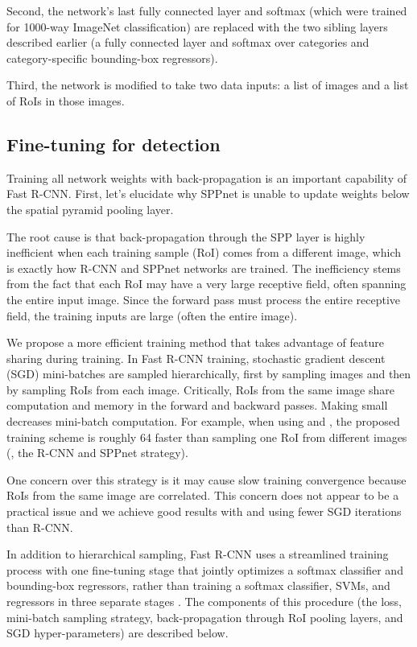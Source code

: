 \documentclass[10pt,twocolumn,letterpaper]{article}
\newcommand{\X}{\xspace}
\newcommand{\roi}{RoI\xspace}
\begin{document}
Second, the network's last fully connected layer and softmax (which were trained for 1000-way ImageNet classification) are replaced with the two sibling layers described earlier (a fully connected layer and softmax over  categories and category-specific bounding-box regressors).

Third, the network is modified to take two data inputs: a list of images and a list of {\roi}s in those images.


\subsection{Fine-tuning for detection}
Training all network weights with back-propagation is an important capability of Fast R-CNN.
First, let's elucidate why SPPnet is unable to update weights below the spatial pyramid pooling layer.

The root cause is that back-propagation through the SPP layer is highly inefficient when each training sample (\ie \roi) comes from a different image, which is exactly how R-CNN and SPPnet networks are trained.
The inefficiency stems from the fact that each \roi may have a very large receptive field, often spanning the entire input image.
Since the forward pass must process the entire receptive field, the training inputs are large (often the entire image).

We propose a more efficient training method that takes advantage of feature sharing during training.
In Fast R-CNN training, stochastic gradient descent (SGD) mini-batches are sampled hierarchically, first by sampling  images and then by sampling  {\roi}s from each image.
Critically, {\roi}s from the same image share computation and memory in the forward and backward passes.
Making  small decreases mini-batch computation.
For example, when using  and , the proposed training scheme is roughly 64\X faster than sampling one {\roi} from  different images (\ie, the R-CNN and SPPnet strategy).

One concern over this strategy is it may cause slow training convergence because {\roi}s from the same image are correlated.
This concern does not appear to be a practical issue and we achieve good results with  and  using fewer SGD iterations than R-CNN.

In addition to hierarchical sampling, Fast R-CNN uses a streamlined training process with one fine-tuning stage that jointly optimizes a softmax classifier and bounding-box regressors, rather than training a softmax classifier, SVMs, and regressors in three separate stages \cite{girshick2014rcnn,he2014spp}.
The components of this procedure (the loss, mini-batch sampling strategy, back-propagation through \roi pooling layers, and SGD hyper-parameters) are described below.
\end{document}
